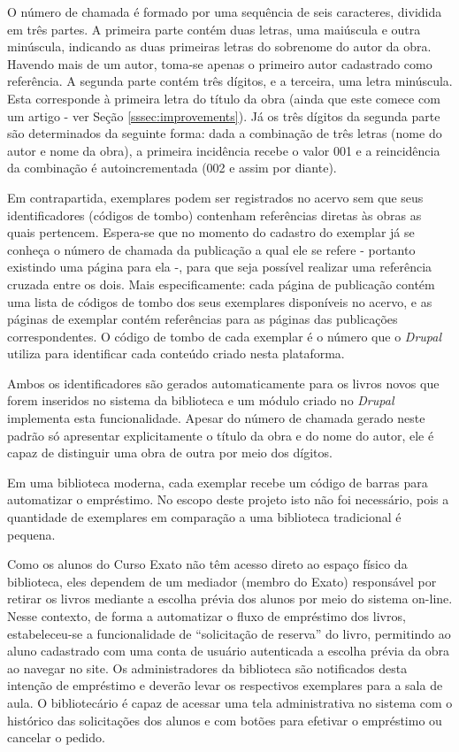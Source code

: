 \documentclass[a4paper]{article}
\begin{document}
O número de chamada é formado por uma sequência de seis caracteres, dividida em três partes. A primeira parte contém duas letras, uma maiúscula e outra minúscula, indicando as duas primeiras letras do sobrenome do autor da obra. Havendo mais de um autor, toma-se apenas o primeiro autor cadastrado como referência. A segunda parte contém três dígitos, e a terceira, uma letra minúscula. Esta corresponde à primeira letra do título da obra (ainda que este comece com um artigo - ver Seção \ref{sssec:improvements}). Já os três dígitos da segunda parte são determinados da seguinte forma: dada a combinação de três letras (nome do autor e nome da obra), a primeira incidência recebe o valor 001 e a reincidência da combinação é autoincrementada (002 e assim por diante).

Em contrapartida, exemplares podem ser registrados no acervo sem que seus identificadores (códigos de tombo) contenham referências diretas às obras as quais pertencem. Espera-se que no momento do cadastro do exemplar já se conheça o número de chamada da publicação a qual ele se refere - portanto existindo uma página para ela -, para que seja possível realizar uma referência cruzada entre os dois. Mais especificamente: cada página de publicação contém uma lista de códigos de tombo dos seus exemplares disponíveis no acervo, e as páginas de exemplar contém referências para as páginas das publicações correspondentes. O código de tombo de cada exemplar é o número que o \textit{Drupal} utiliza para identificar cada conteúdo criado nesta plataforma.

Ambos os identificadores são gerados automaticamente para os livros novos que forem inseridos no sistema da biblioteca e um módulo criado no \textit{Drupal} implementa esta funcionalidade. Apesar do número de chamada gerado neste padrão só apresentar explicitamente o título da obra e do nome do autor, ele é capaz de distinguir uma obra de outra por meio dos dígitos.

Em uma biblioteca moderna, cada exemplar recebe um código de barras para automatizar o empréstimo. No escopo deste projeto isto não foi necessário, pois a quantidade de exemplares em comparação a uma biblioteca tradicional é pequena.

Como os alunos do Curso Exato não têm acesso direto ao espaço físico da biblioteca, eles dependem de um mediador (membro do Exato) responsável por retirar os livros mediante a escolha prévia dos alunos por meio do sistema on-line.  Nesse contexto, de forma a automatizar o fluxo de empréstimo dos livros, estabeleceu-se a funcionalidade de “solicitação de reserva” do livro, permitindo ao aluno cadastrado com uma conta de usuário autenticada a escolha prévia da obra ao navegar no site. Os administradores da biblioteca são notificados desta intenção de empréstimo e deverão levar os respectivos exemplares para a sala de aula. O bibliotecário é capaz de acessar uma tela administrativa no sistema com o histórico das solicitações dos alunos e com botões para efetivar o empréstimo ou cancelar o pedido.
\end{document}
